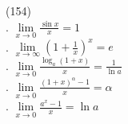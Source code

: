 (154)\\
. $\lim\limits_{x\to 0} \frac{\sin x}{x} = 1$\\
. $\lim\limits_{x\to\infty} (1 + \frac{1}{x})^x = e$\\
. $\lim\limits_{x\to 0} \frac{\log_a(1 + x)}{x} = \frac{1}{\ln a}$\\
. $\lim\limits_{x\to 0} \frac{(1 + x)^{\alpha} - 1}{x} = \alpha$\\
. $\lim\limits_{x\to 0} \frac{a^x - 1}{x} = \ln a$\\